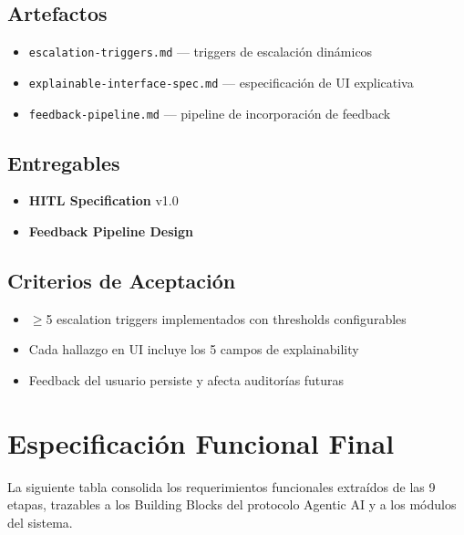 \documentclass[12pt,a4paper]{article}
\begin{document}
\subsection*{Artefactos}
\begin{itemize}
  \item \texttt{escalation-triggers.md} --- triggers de escalación dinámicos
  \item \texttt{explainable-interface-spec.md} --- especificación de UI explicativa
  \item \texttt{feedback-pipeline.md} --- pipeline de incorporación de feedback
\end{itemize}

\subsection*{Entregables}
\begin{itemize}
  \item \textbf{HITL Specification} v1.0
  \item \textbf{Feedback Pipeline Design}
\end{itemize}

\subsection*{Criterios de Aceptación}
\begin{itemize}
  \item[{${[\;]}$}] $\geq$5 escalation triggers implementados con thresholds configurables
  \item[{${[\;]}$}] Cada hallazgo en UI incluye los 5 campos de explainability
  \item[{${[\;]}$}] Feedback del usuario persiste y afecta auditorías futuras
\end{itemize}

\section{Especificación Funcional Final}

La siguiente tabla consolida los requerimientos funcionales extraídos de las 9 etapas, trazables a los Building Blocks del protocolo Agentic AI y a los módulos del sistema.
\end{document}
